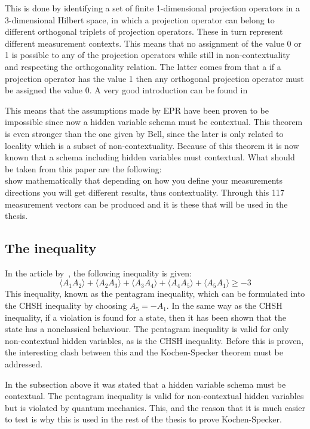 \documentclass[
  utf8,%
  parskip,%
  largesmallcaps,intlimits,widermath,%
  sharecounter,nobreak,definition=marks,%
  noparts%
]{rtthesis}
\begin{document}
This is done by identifying a set of finite 1-dimensional projection operators in a 3-dimensional Hilbert space, in which a projection operator can belong to different orthogonal triplets of projection operators. These in turn represent different measurement contexts. This means that no assignment of the value 0 or 1 is possible to any of the projection operators while still in non-contextuality and respecting the orthogonality relation. The latter comes from that a if a projection operator has the value 1 then any orthogonal projection operator must be assigned the value 0. A very good introduction can be found in \cite{Bub2010}

This means that the assumptions made by EPR have been proven to be impossible since now a hidden variable schema must be contextual. This theorem is even stronger than the one given by Bell, since the later is only related to locality which is a subset of non-contextuality. 
Because of this theorem it is now known that a schema including hidden variables must contextual.
What should be taken from this paper are the following:\\
\cite{Kochen1968The} show mathematically that depending on how you define your measurements directions you will get different results, thus contextuality. Through this 117 measurement vectors can be produced and it is these that will be used in the thesis. 
\subsection{The inequality}\label{sec:intro:Background of quantum mechanics:Ine}
In the article by~\cite{PhysRevLett.101.020403}, the following inequality is given:
\begin{equation} \label{eq:Inequality}
\langle A_1 A_2 \rangle + \langle A_2 A_3 \rangle + \langle A_3 A_4 \rangle + \langle A_4 A_5 \rangle +
\langle A_5 A_1 \rangle \geq -3
\end{equation}
This inequality, known as the pentagram inequality, which can be formulated into the CHSH inequality by choosing $A_5 = -A_1$.
In the same way as the CHSH inequality, if a violation is found for a state, then it has been shown that the state has a nonclassical behaviour. The pentagram inequality is valid for only non-contextual hidden variables, as is the CHSH inequality. Before this is proven, the interesting clash between this and the Kochen-Specker theorem must be addressed.

In the subsection above it was stated that a hidden variable schema must be contextual. The pentagram inequality is valid for non-contextual hidden variables but is violated by quantum mechanics. This, and the reason that it is much easier to test is why this is used in the rest of the thesis to prove Kochen-Specker.
\end{document}

